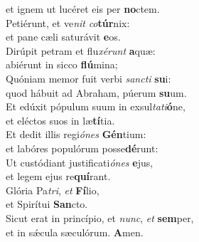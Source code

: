 \evenverse et ignem ut lucéret eis per \textbf{no}ctem.\\
\oddverse Petiérunt, et ve\textit{nit} \textit{co}\textbf{túr}nix:~\*\\
\oddverse et pane cæli saturávit \textbf{e}os.\\
\evenverse Dirúpit petram et flu\textit{xé}\textit{runt} \textbf{a}quæ:~\*\\
\evenverse abiérunt in sicco \textbf{flú}mina;\\
\oddverse Quóniam memor fuit verbi \textit{san}\textit{cti} \textbf{su}i:~\*\\
\oddverse quod hábuit ad Abraham, púerum \textbf{su}um.\\
\evenverse Et edúxit pópulum suum in exsul\textit{ta}\textit{ti}\textbf{ó}ne,~\*\\
\evenverse et eléctos suos in læ\textbf{tí}tia.\\
\oddverse Et dedit illis regi\textit{ó}\textit{nes} \textbf{Gén}tium:~\*\\
\oddverse et labóres populórum posse\textbf{dé}runt:\\
\evenverse Ut custódiant justificati\textit{ó}\textit{nes} \textbf{e}jus,~\*\\
\evenverse et legem ejus re\textbf{quí}rant.\\
\oddverse Glória Pa\textit{tri}, \textit{et} \textbf{Fí}lio,~\*\\
\oddverse et Spirítui \textbf{San}cto.\\
\evenverse Sicut erat in princípio, et \textit{nunc}, \textit{et} \textbf{sem}per,~\*\\
\evenverse et in sǽcula sæculórum. \textbf{A}men.\\
